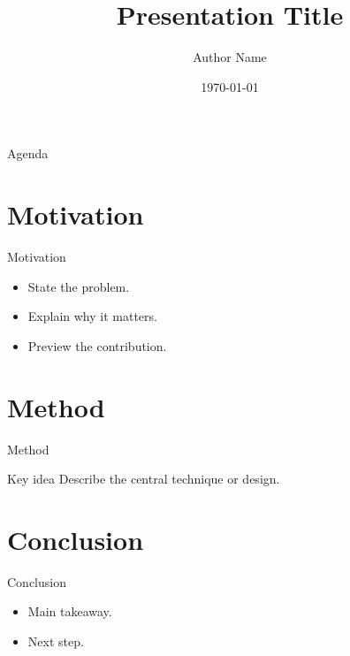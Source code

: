 \documentclass{beamer}
\title{Presentation Title}
\author{Author Name}
\institute{Organization}
\date{\today}
\begin{document}
\begin{frame}
  \titlepage
\end{frame}

\begin{frame}{Agenda}
  \tableofcontents
\end{frame}

\section{Motivation}
\begin{frame}{Motivation}
  \begin{itemize}
    \item State the problem.
    \item Explain why it matters.
    \item Preview the contribution.
  \end{itemize}
\end{frame}

\section{Method}
\begin{frame}{Method}
  \begin{block}{Key idea}
    Describe the central technique or design.
  \end{block}
\end{frame}

\section{Conclusion}
\begin{frame}{Conclusion}
  \begin{itemize}
    \item Main takeaway.
    \item Next step.
  \end{itemize}
\end{frame}
\end{document}
